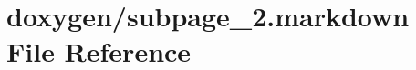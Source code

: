 \hypertarget{subpage__2_8markdown}{}\section{doxygen/subpage\+\_\+2.markdown File Reference}
\label{subpage__2_8markdown}
